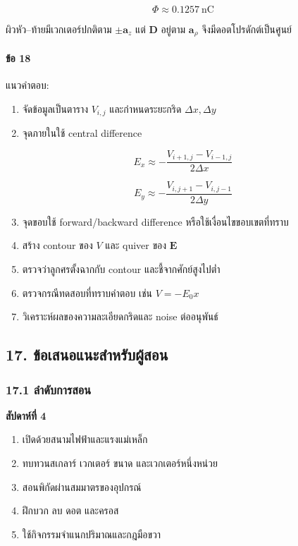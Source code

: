 \[
\boxed{\Phi\approx0.1257\ \text{nC}}
\]

ผิวหัว--ท้ายมีเวกเตอร์ปกติตาม \(\pm\mathbf{a}_z\) แต่ \(\mathbf{D}\) อยู่ตาม \(\mathbf{a}_\rho\) จึงมีดอตโปรดักต์เป็นศูนย์

\paragraph{ข้อ 18}

แนวคำตอบ:

\begin{enumerate}
\item จัดข้อมูลเป็นตาราง \(V_{i,j}\) และกำหนดระยะกริด \(\Delta x,\Delta y\)
\item จุดภายในใช้ central difference
\end{enumerate}

\[
E_x\approx-\frac{V_{i+1,j}-V_{i-1,j}}{2\Delta x}
\]

\[
E_y\approx-\frac{V_{i,j+1}-V_{i,j-1}}{2\Delta y}
\]

\begin{enumerate}
\setcounter{enumi}{2}
\item จุดขอบใช้ forward/backward difference หรือใช้เงื่อนไขขอบเขตที่ทราบ
\item สร้าง contour ของ \(V\) และ quiver ของ \(\mathbf{E}\)
\item ตรวจว่าลูกศรตั้งฉากกับ contour และชี้จากศักย์สูงไปต่ำ
\item ตรวจกรณีทดสอบที่ทราบคำตอบ เช่น \(V=-E_0x\)
\item วิเคราะห์ผลของความละเอียดกริดและ noise ต่ออนุพันธ์
\end{enumerate}

\subsection{17. ข้อเสนอแนะสำหรับผู้สอน}

\subsubsection{17.1 ลำดับการสอน}

\textbf{สัปดาห์ที่ 4}

\begin{enumerate}
\item เปิดด้วยสนามไฟฟ้าและแรงแม่เหล็ก
\item ทบทวนสเกลาร์ เวกเตอร์ ขนาด และเวกเตอร์หนึ่งหน่วย
\item สอนพิกัดผ่านสมมาตรของอุปกรณ์
\item ฝึกบวก ลบ ดอต และครอส
\item ใช้กิจกรรมจำแนกปริมาณและกฎมือขวา
\end{enumerate}

